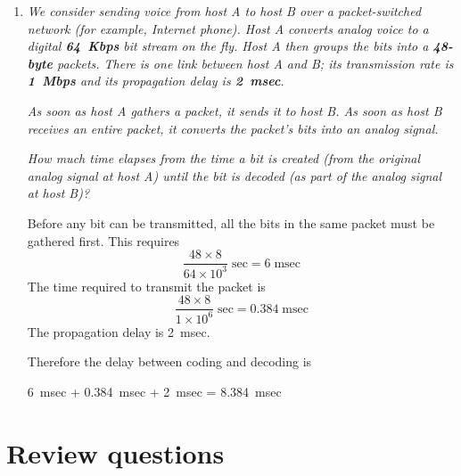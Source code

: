 \documentclass[12pt,a4paper]{article}
\begin{document}
\begin{enumerate}
\begin{enumerate}
      \item \emph{Express the total delay as a function of
        \(\frac{L}{R}\).}

      Let us call \(d (\frac{L}{R})\) the total delay in function of
      \(\frac{L}{R}\). We have
      \[
       \frac{L}{R} \frac{1}{1-I} = \frac{L}{R} \frac{1}{1 -
         \frac{La}{R}} = \frac{x}{1 - ax} = d (x)
      \]
      where \(x = \frac{L}{R}\).

    \end{enumerate}

  \item \emph{We consider sending voice from host A to host B over a
    packet-switched network (for example, Internet phone). Host A
    converts analog voice to a digital \textbf{64~Kbps} bit stream on
    the fly. Host A then groups the bits into a \textbf{48-byte}
    packets. There is one link between host A and B; its transmission
    rate is \textbf{1~Mbps} and its propagation delay is
    \textbf{2~msec}.}

    \emph{As soon as host A gathers a packet, it sends it to host
      B. As soon as host B receives an \emph{entire} packet, it
      converts the packet's bits into an analog signal.}

    \emph{How much time elapses from the time a bit is created (from
      the original analog signal at host A) until the bit is decoded
      (as part of the analog signal at host B)?}

    Before any bit can be transmitted, all the bits in the same packet
    must be gathered first. This requires
    \[
      \frac{48 \times 8}{64 \times 10^3} \; \text{sec} = 6 \;
      \text{msec}
    \]
    The time required to transmit the packet is
    \[
      \frac{48 \times 8}{1 \times 10^{6}} \; \text{sec} = 0.384 \;
      \text{msec}
    \]
    The propagation delay is 2~msec.

    Therefore the delay between coding and decoding is
    \begin{center}
      6~msec + 0.384~msec + 2~msec = 8.384~msec
    \end{center}

\end{enumerate}


\section{Review questions}
\end{document}
